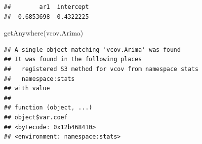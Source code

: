 \documentclass[
]{book}
\newenvironment{Shaded}{\begin{snugshade}}{\end{snugshade}}
\newcommand{\FunctionTok}[1]{\textcolor[rgb]{0.00,0.00,0.00}{#1}}
\newcommand{\NormalTok}[1]{#1}
\theoremstyle{definition}
\theoremstyle{definition}
\theoremstyle{definition}
\theoremstyle{definition}
\theoremstyle{remark}
\begin{document}
\begin{verbatim}
##        ar1  intercept 
##  0.6853698 -0.4322225
\end{verbatim}

\begin{Shaded}
\begin{Highlighting}[]
\FunctionTok{getAnywhere}\NormalTok{(vcov.Arima)}
\end{Highlighting}
\end{Shaded}

\begin{verbatim}
## A single object matching 'vcov.Arima' was found
## It was found in the following places
##   registered S3 method for vcov from namespace stats
##   namespace:stats
## with value
## 
## function (object, ...) 
## object$var.coef
## <bytecode: 0x12b468410>
## <environment: namespace:stats>
\end{verbatim}
\end{document}
